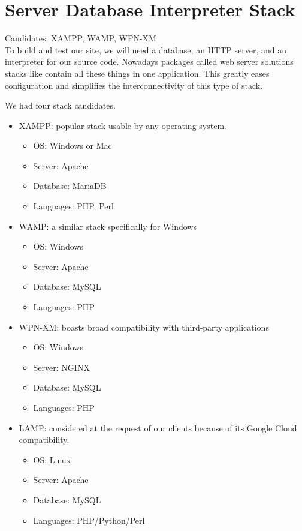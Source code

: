\documentclass[letterpaper,10pt,titlepage]{article}
\begin{document}
\section{Server Database Interpreter Stack}

\normalsize Candidates: XAMPP, WAMP, WPN-XM
\\

\small To build and test our site, we will need a database, an HTTP server, and an interpreter for our source code. Nowadays packages called web server solutions stacks like contain all these things in one application. This greatly eases configuration and simplifies the interconnectivity of this type of stack. 

We had four stack candidates. 
\begin{itemize}
	\item XAMPP: popular stack usable by any operating system.
	\begin{itemize}
		\item OS: Windows or Mac
		\item Server: Apache
		\item Database: MariaDB
		\item Languages: PHP, Perl
	\end{itemize}
\item WAMP: a similar stack specifically for Windows
	\begin{itemize}
		\item OS: Windows
		\item Server: Apache
		\item Database: MySQL
		\item Languages: PHP
	\end{itemize}
	\item WPN-XM: boasts broad compatibility with third-party applications
	\begin{itemize}
		\item OS: Windows
		\item Server: NGINX
		\item Database: MySQL
		\item Languages: PHP
	\end{itemize}
	\item LAMP: considered at the request of our clients because of its Google Cloud compatibility.  
	\begin{itemize}
		\item OS: Linux
		\item Server: Apache
		\item Database: MySQL
		\item Languages: PHP/Python/Perl
	\end{itemize}\cite{AlternativeTo}\cite{Bitnami}\cite{Github}
	\end{itemize}
\end{document}
